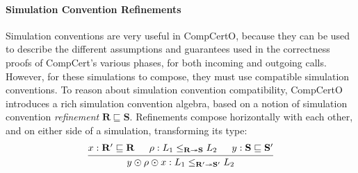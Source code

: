\documentclass[acmsmall,screen,review,anonymous]{acmart}
\begin{document}

\paragraph{Simulation Convention Refinements} %

Simulation conventions are very useful in CompCertO,
because they can be used to describe the different assumptions and guarantees
used in the correctness proofs of CompCert's various phases,
for both incoming and outgoing calls.
However, for these simulations to compose,
they must use compatible simulation conventions.
To reason about simulation convention compatibility,
CompCertO introduces a rich simulation convention algebra,
based on a notion of simulation convention \emph{refinement}
$\mathbf{R} \sqsubseteq \mathbf{S}$.
Refinements compose horizontally with each other,
and on either side of a simulation,
transforming its type:
\[
  \begin{prooftree}
    \hypo{x : \mathbf{R}' \sqsubseteq \mathbf{R}}
    \hypo{\rho : L_1 \le_{\mathbf{R} \twoheadrightarrow \mathbf{S}} L_2}
    \hypo{y : \mathbf{S} \sqsubseteq \mathbf{S}'}
    \infer3{y \odot \rho \odot x :
       L_1 \le_{\mathbf{R}' \twoheadrightarrow \mathbf{S}'} L_2}
  \end{prooftree}
\]

\end{document}
